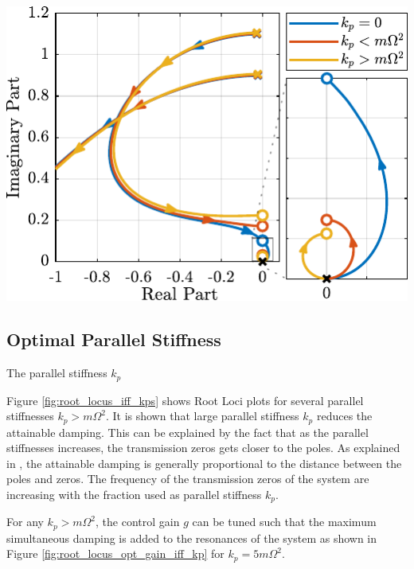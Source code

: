 \documentclass{ISMA_USD2020}
\begin{document}
\begin{minipage}[b]{0.52\linewidth}
\begin{center}
\includegraphics[scale=1]{figs/root_locus_iff_kp.pdf}
\end{center}
\end{minipage}

\subsection{Optimal Parallel Stiffness}
\label{sec:orgbcc4bb0}
The parallel stiffness \(k_p\)

Figure \ref{fig:root_locus_iff_kps} shows Root Loci plots for several parallel stiffnesses \(k_p > m \Omega^2\).
It is shown that large parallel stiffness \(k_p\) reduces the attainable damping.
This can be explained by the fact that as the parallel stiffnesses increases, the transmission zeros gets closer to the poles.
As explained in \cite{preumont18_vibrat_contr_activ_struc_fourt_edition}, the attainable damping is generally proportional to the distance between the poles and zeros.
The frequency of the transmission zeros of the system are increasing with the fraction used as parallel stiffness \(k_p\).

For any \(k_p > m \Omega^2\), the control gain \(g\) can be tuned such that the maximum simultaneous damping is added to the resonances of the system as shown in Figure \ref{fig:root_locus_opt_gain_iff_kp} for \(k_p = 5 m \Omega^2\).
\end{document}
